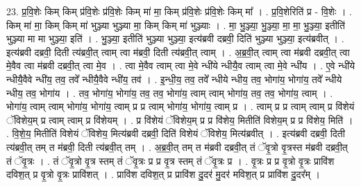\documentclass[17pt]{extarticle}
\begin{document}
23. प्र॒वि॒शेः किम् किम् प्र॑वि॒शेः प्र॑वि॒शेः किम् मा॑ मा॒ किम् प्र॑वि॒शेः प्र॑वि॒शेः किम् मा᳚ । . प्र॒वि॒शेरिति॑ प्र - वि॒शेः । . किम् मा॑ मा॒ किम् किम् मा॑ भुञ्ज्या भुञ्ज्या मा॒ किम् किम् मा॑ भुञ्ज्याः । . मा॒ भु॒ञ्ज्या॒ भु॒ञ्ज्या॒ मा॒ मा॒ भु॒ञ्ज्या॒ इतीति॑ भुञ्ज्या मा मा भुञ्ज्या॒ इति॑ । . भु॒ञ्ज्या॒ इतीति॑ भुञ्ज्या भुञ्ज्या॒ इत्य॑ब्रवी दब्रवी॒ दिति॑ भुञ्ज्या भुञ्ज्या॒ इत्य॑ब्रवीत् । . इत्य॑ब्रवी दब्रवी॒ दिती त्य॑ब्रवी॒त् त्वाम् त्वा म॑ब्रवी॒ दिती त्य॑ब्रवी॒त् त्वाम् । . अ॒ब्र॒वी॒त् त्वाम् त्वा म॑ब्रवी दब्रवी॒त् त्वा मे॒वैव त्वा म॑ब्रवी दब्रवी॒त् त्वा मे॒व । . त्वा मे॒वैव त्वाम् त्वा मे॒वे न्धी॑ये न्धीयै॒व त्वाम् त्वा मे॒वे न्धी॑य । . ए॒वे न्धी॑ये न्धीयै॒वैवे न्धी॑य॒ तव॒ तवे᳚ न्धीयै॒वैवे न्धी॑य॒ तव॑ । . इ॒न्धी॒य॒ तव॒ तवे᳚ न्धीये न्धीय॒ तव॒ भोगा॑य॒ भोगा॑य॒ तवे᳚ न्धीये न्धीय॒ तव॒ भोगा॑य । . तव॒ भोगा॑य॒ भोगा॑य॒ तव॒ तव॒ भोगा॑य॒ त्वाम् त्वाम् भोगा॑य॒ तव॒ तव॒ भोगा॑य॒ त्वाम् । . भोगा॑य॒ त्वाम् त्वाम् भोगा॑य॒ भोगा॑य॒ त्वाम् प्र प्र त्वाम् भोगा॑य॒ भोगा॑य॒ त्वाम् प्र । . त्वाम् प्र प्र त्वाम् त्वाम् प्र वि॑शेयं ॅविशेय॒म् प्र त्वाम् त्वाम् प्र वि॑शेयम् । . प्र वि॑शेयं ॅविशेय॒म् प्र प्र वि॑शेय॒ मितीति॑ विशेय॒म् प्र प्र वि॑शेय॒ मिति॑ । . वि॒शे॒य॒ मितीति॑ विशेयं ॅविशेय॒ मित्य॑ब्रवी दब्रवी॒ दिति॑ विशेयं ॅविशेय॒ मित्य॑ब्रवीत् । . इत्य॑ब्रवी दब्रवी॒ दिती त्य॑ब्रवी॒त् तम् त म॑ब्रवी॒ दिती त्य॑ब्रवी॒त् तम् । . अ॒ब्र॒वी॒त् तम् त म॑ब्रवी दब्रवी॒त् तं ॅवृ॒त्रो वृ॒त्रस्त म॑ब्रवी दब्रवी॒त् तं ॅवृ॒त्रः । . तं ॅवृ॒त्रो वृ॒त्र स्तम् तं ॅवृ॒त्रः प्र प्र वृ॒त्र स्तम् तं ॅवृ॒त्रः प्र । . वृ॒त्रः प्र प्र वृ॒त्रो वृ॒त्रः प्रावि॑श दविश॒त् प्र वृ॒त्रो वृ॒त्रः प्रावि॑शत् । . प्रावि॑श दविश॒त् प्र प्रावि॑श दु॒दर॑ मु॒दर॑ मविश॒त् प्र प्रावि॑श दु॒दर᳚म् । \newline
\end{document}
